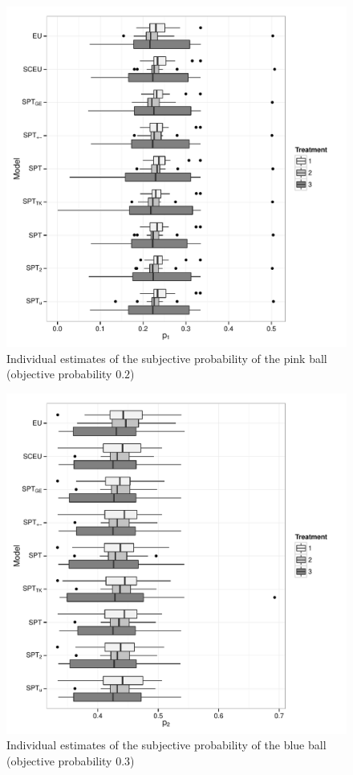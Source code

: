 \documentclass[11pt, a4paper, oneside,final,notitlepage,onecolumn]{article}\usepackage[]{graphicx}\usepackage[]{color}
\makeatletter
\def\maxwidth{ %
  \ifdim\Gin@nat@width>\linewidth
    \linewidth
  \else
    \Gin@nat@width
  \fi
}
\makeatother
\begin{document}
\begin{figure}
\includegraphics[width=\maxwidth]{figure/p1_boxplot-1} \caption[Individual estimates of the subjective probability of the pink ball (objective probability ]{Individual estimates of the subjective probability of the pink ball (objective probability $0.2$)}\label{fig:p1_boxplot}
\end{figure}




\begin{figure}
\includegraphics[width=\maxwidth]{figure/p2_boxplot-1} \caption[Individual estimates of the subjective probability of the blue ball (objective probability ]{Individual estimates of the subjective probability of the blue ball (objective probability $0.3$)}\label{fig:p2_boxplot}
\end{figure}
\end{document}
